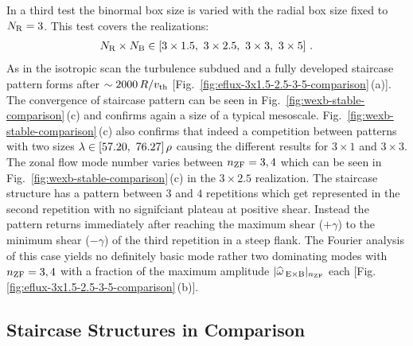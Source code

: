 In a third test the binormal box size is varied with the radial box size fixed to $N_\mathrm{R} = 3$.
This test covers the realizations:
\begin{gather*}
	N_\mathrm{R} \times N_\mathrm{B} \in [3\times1.5,~3\times2.5,~3\times3,~3\times5]~.
\end{gather*}
As in the isotropic scan the turbulence subdued and a fully developed staircase pattern forms after $\sim 2000\,R/v_{\mathrm{th}}$ [Fig.~\ref{fig:eflux-3x1.5-2.5-3-5-comparison}\,(a)]. The convergence of staircase pattern can be seen in Fig.~\ref{fig:wexb-stable-comparison}\,(c) and confirms again a size of a typical mesoscale. Fig.~\ref{fig:wexb-stable-comparison}\,(c) also confirms that indeed a competition between patterns with two sizes $\lambda \in [57.20,~ 76.27]\,\rho$ causing the different results for $3 \times 1$ and $3\times 3$. The zonal flow mode number varies between $n_\mathrm{ZF} = 3,4$ which can be seen in Fig.~\ref{fig:wexb-stable-comparison}\,(c) in the $3\times 2.5$ realization. The staircase structure has a pattern between $3$ and $4$ repetitions which get represented in the second repetition with no signifciant plateau at positive shear. Instead the pattern returns immediately after reaching the maximum shear ($+ \gamma$) to the minimum shear ($- \gamma$) of the third repetition in a steep flank. The Fourier analysis of this case yields no definitely basic mode rather two dominating modes with $n_\mathrm{ZF} = 3, 4$ with a fraction of the maximum amplitude $|\widehat{\omega}_{\mathrm{\:E \times B}}|_{n_\mathrm{ZF}}$ each [Fig. \ref{fig:eflux-3x1.5-2.5-3-5-comparison}\,(b)].
\bigskip

\subsection{Staircase Structures in Comparison}
\label{sub:comparisonwexb}

